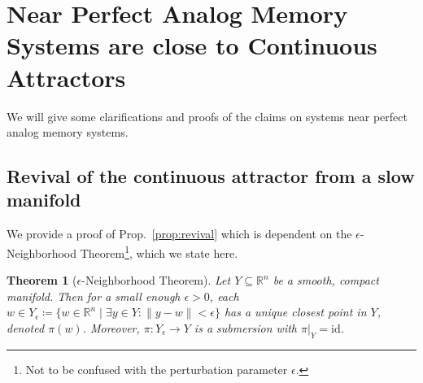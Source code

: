 \documentclass{article} %
\newcounter{ct}
\newtheorem{theorem}{Theorem}
\theoremstyle{definition}
\theoremstyle{remark}
\begin{document}
\newpage
\section{Near Perfect Analog Memory Systems are close to Continuous Attractors}
We will give some clarifications and proofs of the claims on systems near perfect analog memory systems.

\subsection{Revival of the continuous attractor from a slow manifold}\label{sec:supp:proofprop1}

We  provide a proof of Prop.~\ref{prop:revival} which is dependent on the \(\epsilon\)-Neighborhood Theorem\footnote{Not to be confused with the perturbation parameter \(\epsilon\).}, which we state here.

\begin{theorem}[\(\epsilon\)-Neighborhood Theorem\citep{guillemin2010differential}]
Let \( Y \subseteq \mathbb{R}^{n} \) be a smooth, compact manifold. Then for a small enough \(\epsilon > 0\),
each \( w \in Y_{\epsilon} \coloneqq \{ w \in \mathbb{R}^{n} \mid \exists y \in Y : \|y - w\| < \epsilon \} \)
has a unique closest point in \( Y \), denoted \( \pi(w) \).
Moreover, \( \pi: Y_{\epsilon} \to Y \) is a submersion with \( \pi|_{Y} = \text{id} \).
\end{theorem}

\end{document}
